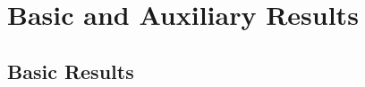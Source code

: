 \appendix
\setcounter{chapter}{0}
\renewcommand{\chaptername}{Appendix}
\renewcommand{\theequation}{\Alph{chapter}.\arabic{section}.\arabic{equation}}
\setcounter{equation}{0}
\chapter{Basic and Auxiliary Results}
\section{Basic Results}
